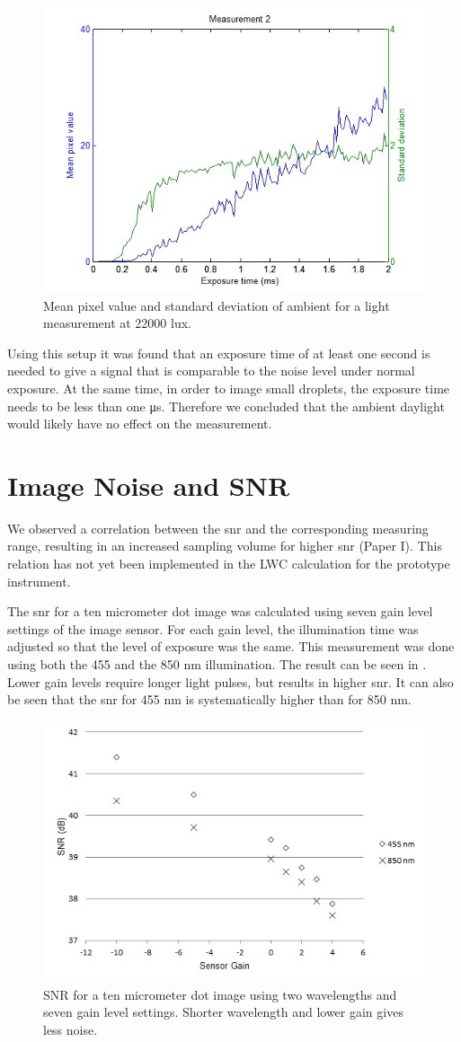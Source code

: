 \begin{figure}%
\centering\includegraphics[width=0.6\linewidth]{figures/Amblight22000lux}
\caption{Mean pixel value and standard deviation of ambient for a light measurement at 22000 lux.}
\label{fig:ambientlight}
\end{figure}

Using this setup it was found that an exposure time of at least one second is needed to give a signal that is comparable to the noise level under normal exposure. At the same time, in order to image small droplets, the exposure time needs to be less than one μs. Therefore we concluded that the ambient daylight would likely have no effect on the measurement.

\section{Image Noise and SNR}

We observed a correlation between the \gls{snr} and the corresponding measuring range, resulting in an increased sampling volume for higher \gls{snr} \cite{ryd2015}(Paper I). This relation has not yet been implemented in the LWC calculation for the prototype instrument.

The \gls{snr} for a ten micrometer dot image was calculated using seven gain level settings of the image sensor. For each gain level, the illumination time was adjusted so that the level of exposure was the same. This measurement was done using both the 455 and the 850 nm illumination. The result can be seen in . Lower gain levels require longer light pulses, but results in higher \gls{snr}. It can also be seen that the \gls{snr} for 455 nm is systematically higher than for 850 nm. 

\begin{figure}%
\centering\includegraphics[width=0.6\linewidth]{figures/NoiseGain}
\caption{SNR for a ten micrometer dot image using two wavelengths and seven gain level settings. Shorter wavelength and lower gain gives less noise.}
\label{fig:noisegain}
\end{figure}

